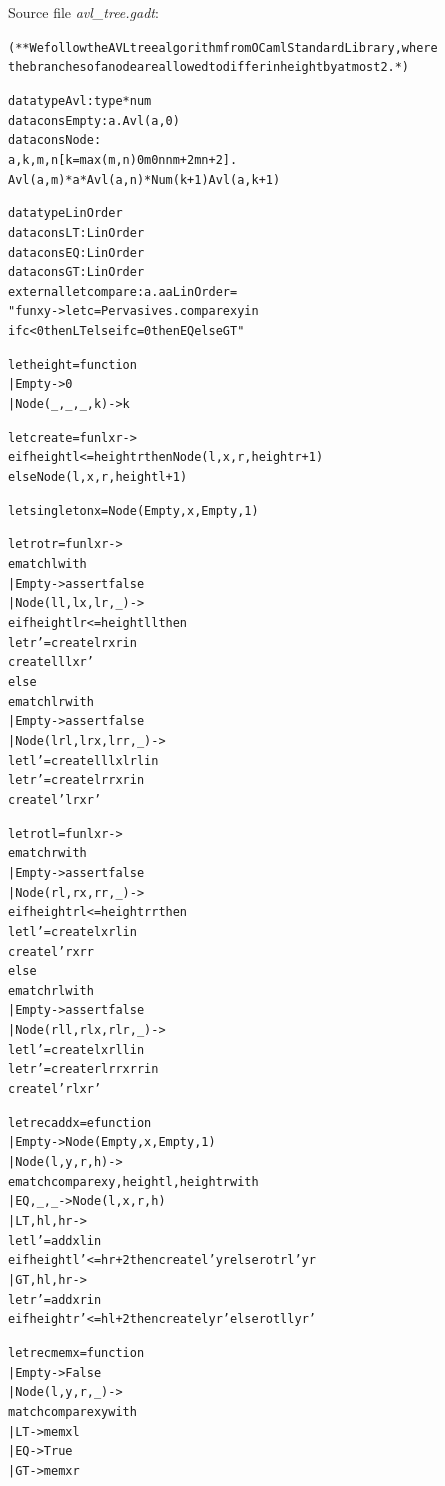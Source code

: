 \documentclass{article}
\newcommand{\tmem}[1]{{\em #1\/}}
\newenvironment{tmcode}[1][]{\begin{alltt}}{\end{alltt}}
\begin{document}
Source file {\tmem{avl\_tree.gadt}}:
\begin{tmcode}
(** We follow the AVL tree algorithm from OCaml Standard Library, where 
    the branches of a node are allowed to differ in height by at most 2. *)

datatype Avl : type * num
datacons Empty : a. Avl (a, 0)
datacons Node :
  a,k,m,n [k=max(m,n)  0m  0n  nm+2  mn+2].
     Avl (a, m) * a * Avl (a, n) * Num (k+1)  Avl (a, k+1)

datatype LinOrder
datacons LT : LinOrder
datacons EQ : LinOrder
datacons GT : LinOrder
external let compare : a. a  a  LinOrder =
  "fun x y -> let c=Pervasives.compare x y in
              if c<0 then LT else if c=0 then EQ else GT"

let height = function
  | Empty -> 0
  | Node (_, _, _, k) -> k

let create = fun l x r ->
  eif height l <= height r then Node (l, x, r, height r + 1)
  else Node (l, x, r, height l + 1)

let singleton x = Node (Empty, x, Empty, 1)

let rotr = fun l x r ->
    ematch l with
    | Empty -> assert false
    | Node (ll, lx, lr, _) ->
      eif height lr <= height ll then
        let r' = create lr x r in
        create ll lx r'
      else
        ematch lr with
        | Empty -> assert false
        | Node (lrl, lrx, lrr, _) ->
          let l' = create ll lx lrl in
          let r' = create lrr x r in
          create l' lrx r'

let rotl = fun l x r ->
    ematch r with
    | Empty -> assert false
    | Node (rl, rx, rr, _) ->
      eif height rl <= height rr then
        let l' = create l x rl in
        create l' rx rr
      else
        ematch rl with
        | Empty -> assert false
        | Node (rll, rlx, rlr, _) ->
          let l' = create l x rll in
          let r' = create rlr rx rr in
          create l' rlx r'

let rec add x = efunction
  | Empty -> Node (Empty, x, Empty, 1)
  | Node (l, y, r, h) ->
    ematch compare x y, height l, height r with
    | EQ, _, _ -> Node (l, x, r, h)
    | LT, hl, hr ->
      let l' = add x l in
      eif height l' <= hr+2 then create l' y r else rotr l' y r
    | GT, hl, hr ->
      let r' = add x r in
      eif height r' <= hl+2 then create l y r' else rotl l y r'

let rec mem x = function
  | Empty -> False
  | Node (l, y, r, _) ->
    match compare x y with
    | LT -> mem x l
    | EQ -> True
    | GT -> mem x r


\end{tmcode}
\end{document}
